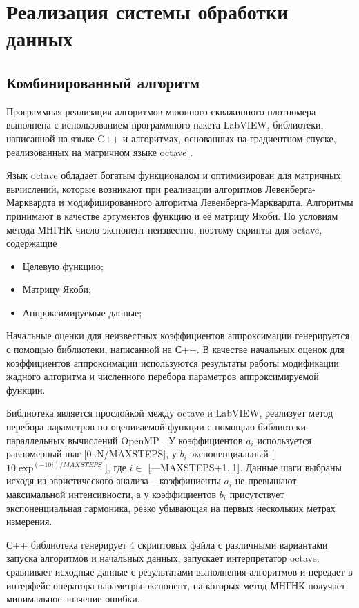 \chapter{Реализация системы обработки данных} \label{chapt3}

\section{Комбинированный алгоритм}
Программная реализация алгоритмов мюонного скважинного плотномера выполнена с использованием 
программного пакета LabVIEW, библиотеки, написанной на языке C++ и алгоритмах, основанных на 
градиентном спуске, реализованных на матричном языке octave \cite{straustrup, octave}. 

Язык octave обладает богатым функционалом и оптимизирован для 
матричных вычислений, которые возникают при реализации алгоритмов 
Левенберга-Марквардта и модифицированного алгоритма 
Левенберга-Марквардта. Алгоритмы принимают в качестве аргументов 
функцию и её матрицу Якоби. По условиям метода МНГНК число 
экспонент неизвестно, поэтому скрипты для octave, содержащие
\begin{itemize}
\item Целевую функцию;
\item Матрицу Якоби;
\item Аппроксимируемые данные;
\end{itemize} 
Начальные оценки для неизвестных коэффициентов аппроксимации генерируется с помощью библиотеки, написанной на С++. В качестве 
начальных оценок для коэффициентов аппроксимации используются 
результаты работы модификации жадного алгоритма и численного 
перебора параметров аппроксимируемой функции. 

Библиотека является прослойкой между octave и LabVIEW, реализует 
метод перебора параметров по оцениваемой функции с помощью библиотеки параллельных вычислений OpenMP \cite{openmp}. У коэффициентов $a_i$ используется равномерный шаг [0..N/MAXSTEPS], у $b_i$ экспоненциальный [$10 \exp^{(-10 i)/MAXSTEPS} $], где $i \in $
[---MAXSTEPS+1..1]. Данные шаги выбраны исходя из эвристического 
анализа -- коэффициенты $a_i$ не превышают максимальной 
интенсивности, а у коэффициентов $b_i$ присутствует 
экспоненциальная гармоника, резко убывающая на первых нескольких 
метрах измерения.

С++ библиотека генерирует 4 скриптовых файла с различными 
вариантами запуска алгоритмов и начальных данных, запускает интерпретатор octave, сравнивает 
исходные данные с результатами выполнения алгоритмов и передает в интерфейс 
оператора параметры экспонент, на которых метод МНГНК получает минимальное значение ошибки.

